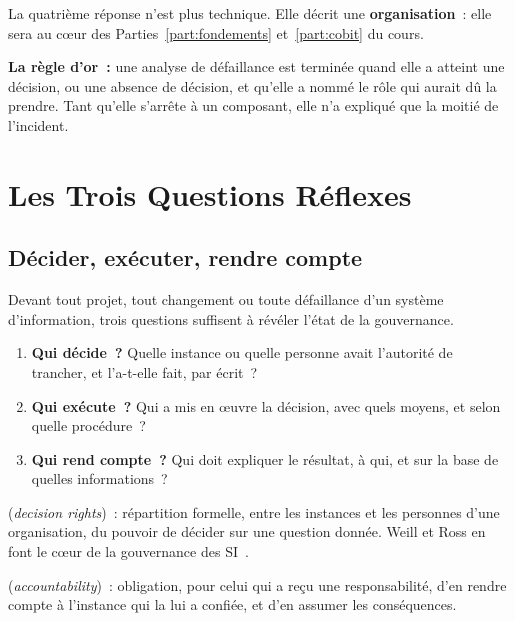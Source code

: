 La quatrième réponse n'est plus technique. Elle décrit une
\textbf{organisation}~: elle sera au cœur des Parties~\ref{part:fondements}
et~\ref{part:cobit} du cours.

\begin{boxinfo}
\textbf{La règle d'or~:} une analyse de défaillance est terminée quand elle
a atteint une décision, ou une absence de décision, et qu'elle a nommé le
rôle qui aurait dû la prendre. Tant qu'elle s'arrête à un composant, elle
n'a expliqué que la moitié de l'incident.
\end{boxinfo}

\section{Les Trois Questions Réflexes}
\label{sec:pro-trois-questions}

\subsection{Décider, exécuter, rendre compte}

Devant tout projet, tout changement ou toute défaillance d'un système
d'information, trois questions suffisent à révéler l'état de la gouvernance.

\begin{enumerate}
    \item \textbf{Qui décide~?} Quelle instance ou quelle personne avait
          l'autorité de trancher, et l'a-t-elle fait, par écrit~?
    \item \textbf{Qui exécute~?} Qui a mis en œuvre la décision, avec quels
          moyens, et selon quelle procédure~?
    \item \textbf{Qui rend compte~?} Qui doit expliquer le résultat, à qui,
          et sur la base de quelles informations~?
\end{enumerate}

\begin{boxdef}
 (\textit{decision
rights})~: répartition formelle, entre les instances et les personnes d'une
organisation, du pouvoir de décider sur une question donnée. Weill et Ross
en font le cœur de la gouvernance des SI~\cite{weill2004itgovernance}.

\medskip
{} (\textit{accountability})~:
obligation, pour celui qui a reçu une responsabilité, d'en rendre compte à
l'instance qui la lui a confiée, et d'en assumer les conséquences.
\end{boxdef}

